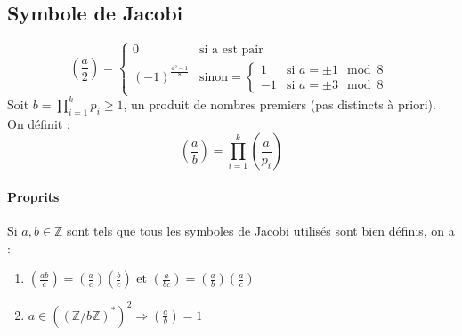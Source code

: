 \documentclass[12pt,a4paper]{report}
\begin{document}
\subsection{Symbole de Jacobi}

$$ \left(\frac{a}{2}\right) = \left\{
\begin{array}{ll}
0 & \mbox{si a est pair} \\
(-1)^{\frac{a^2-1}{8}} & \mbox{sinon} = \left\{\begin{array}{ll}
1 & \mbox{si } a = \pm 1 \mod 8 \\
-1 & \mbox{si } a = \pm 3 \mod 8 \end{array} \right.
\end{array}\right.
$$
Soit $ \displaystyle b= \prod_{i=1}^{k}p_i \geqslant 1$, un produit de nombres premiers (pas distincts à priori). On définit : 
$$  \left(\frac{a}{b}\right)=\prod_{i=1}^{k}  \left(\frac{a}{p_i}\right)  $$
\paragraph{Proprits\\}
Si $a,b \in \mathbb{Z}$ sont tels que tous les symboles de Jacobi utilisés sont bien définis, on a :
\begin{enumerate}
\item $ \displaystyle \left(\frac{ab}{c}\right) =  \left(\frac{a}{c}\right) \left(\frac{b}{c}\right) $ et $  \displaystyle  \left(\frac{a}{bc}\right) =  \left(\frac{a}{b}\right)  \left(\frac{a}{c}\right)$
\item $ \displaystyle a \in \left((\mathbb{Z}/b\mathbb{Z})^*\right)^2 \Rightarrow  \left(\frac{a}{b}\right) =1 $
\end{enumerate}
\end{document}
